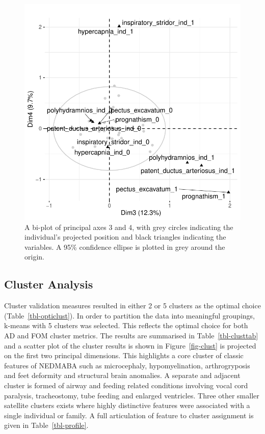 \documentclass[
  authoryear,
  preprint,
  3p]{elsarticle}
\begin{document}
\begin{figure}

{\centering \includegraphics{paper_files/figure-pdf/fig-biplot2-1.pdf}

}

\caption{\label{fig-biplot2}A bi-plot of principal axes 3 and 4, with
grey circles indicating the individual's projected position and black
triangles indicating the variables. A 95\% confidence ellipse is plotted
in grey around the origin.}

\end{figure}

\hypertarget{cluster-analysis-1}{%
\subsection{Cluster Analysis}\label{cluster-analysis-1}}

Cluster validation measures resulted in either 2 or 5 clusters as the
optimal choice (Table~\ref{tbl-opticlust}). In order to partition the
data into meaningful groupings, k-means with 5 clusters was selected.
This reflects the optimal choice for both AD and FOM cluster metrics.
The results are summarised in Table~\ref{tbl-clusttab} and a scatter
plot of the cluster results is shown in Figure~\ref{fig-clust} is
projected on the first two principal dimensions. This highlights a core
cluster of classic features of NEDMABA such as microcephaly,
hypomyelination, arthrogryposis and feet deformity and structural brain
anomalies. A separate and adjacent cluster is formed of airway and
feeding related conditions involving vocal cord paralysis, tracheostomy,
tube feeding and enlarged ventricles. Three other smaller satellite
clusters exists where highly distinctive features were associated with a
single individual or family. A full articulation of feature to cluster
assignment is given in Table~\ref{tbl-profile}.
\end{document}
